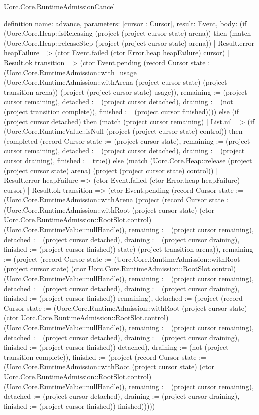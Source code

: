 \begin{lexlean}{Uorc.Core.RuntimeAdmissionCancel}
\begin{semanticmodule}
definition{
  name: advance,
  parameters: [cursor : Cursor],
  result: Event,
  body: (if (Uorc.Core.Heap::isReleasing (project (project cursor state) arena)) then (match (Uorc.Core.Heap::releaseStep (project (project cursor state) arena))
    | Result.error heapFailure => (ctor Event.failed (ctor Error.heap heapFailure) cursor)
    | Result.ok transition => (ctor Event.pending (record Cursor {state := (Uorc.Core.RuntimeAdmission::with_usage (Uorc.Core.RuntimeAdmission::withArena (project cursor state) (project transition arena)) (project (project cursor state) usage)), remaining := (project cursor remaining), detached := (project cursor detached), draining := (not (project transition complete)), finished := (project cursor finished)}))) else (if (project cursor detached) then (match (project cursor remaining)
    | List.nil => (if (Uorc.Core.RuntimeValue::isNull (project (project cursor state) control)) then (completed (record Cursor {state := (project cursor state), remaining := (project cursor remaining), detached := (project cursor detached), draining := (project cursor draining), finished := true})) else (match (Uorc.Core.Heap::release (project (project cursor state) arena) (project (project cursor state) control))
      | Result.error heapFailure => (ctor Event.failed (ctor Error.heap heapFailure) cursor)
      | Result.ok transition => (ctor Event.pending (record Cursor {state := (Uorc.Core.RuntimeAdmission::withArena (project (record Cursor {state := (Uorc.Core.RuntimeAdmission::withRoot (project cursor state) (ctor Uorc.Core.RuntimeAdmission::RootSlot.control) (Uorc.Core.RuntimeValue::nullHandle)), remaining := (project cursor remaining), detached := (project cursor detached), draining := (project cursor draining), finished := (project cursor finished)}) state) (project transition arena)), remaining := (project (record Cursor {state := (Uorc.Core.RuntimeAdmission::withRoot (project cursor state) (ctor Uorc.Core.RuntimeAdmission::RootSlot.control) (Uorc.Core.RuntimeValue::nullHandle)), remaining := (project cursor remaining), detached := (project cursor detached), draining := (project cursor draining), finished := (project cursor finished)}) remaining), detached := (project (record Cursor {state := (Uorc.Core.RuntimeAdmission::withRoot (project cursor state) (ctor Uorc.Core.RuntimeAdmission::RootSlot.control) (Uorc.Core.RuntimeValue::nullHandle)), remaining := (project cursor remaining), detached := (project cursor detached), draining := (project cursor draining), finished := (project cursor finished)}) detached), draining := (not (project transition complete)), finished := (project (record Cursor {state := (Uorc.Core.RuntimeAdmission::withRoot (project cursor state) (ctor Uorc.Core.RuntimeAdmission::RootSlot.control) (Uorc.Core.RuntimeValue::nullHandle)), remaining := (project cursor remaining), detached := (project cursor detached), draining := (project cursor draining), finished := (project cursor finished)}) finished)}))))
}
\end{semanticmodule}
\end{lexlean}
